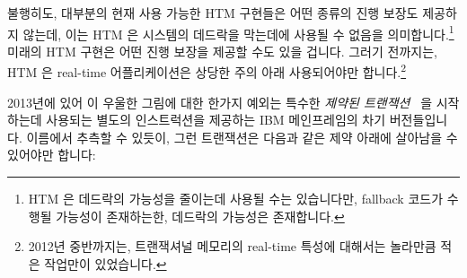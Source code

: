 불행히도, 대부분의 현재 사용 가능한 HTM 구현들은 어떤 종류의 진행 보장도
제공하지 않는데, 이는 HTM 은 시스템의 데드락을 막는데에 사용될 수 없음을
의미합니다.\footnote{
	HTM 은 데드락의 가능성을 줄이는데 사용될 수는 있습니다만, fallback
	코드가 수행될 가능성이 존재하는한, 데드락의 가능성은 존재합니다.}
미래의 HTM 구현은 어떤 진행 보장을 제공할 수도 있을 겁니다.
그러기 전까지는, HTM 은 real-time 어플리케이션은 상당한 주의 아래 사용되어야만
합니다.\footnote{
	2012년 중반까지는, 트랜잭셔널 메모리의 real-time 특성에 대해서는
	놀라만큼 적은 작업만이 있었습니다.}
\iffalse

Even though transaction size, conflicts, and aborts/rollbacks can all
cause transactions to abort, one might hope that sufficiently small and
short-duration transactions could be guaranteed to eventually succeed.
This would permit a transaction to be unconditionally retried, in the
same way that compare-and-swap (CAS) and load-linked/store-conditional
(LL/SC) operations are unconditionally retried in code that uses these
instructions to implement atomic operations.

Unfortunately, most currently available HTM implementation refuse to
make any
sort of forward-progress guarantee, which means that HTM cannot be
used to avoid deadlock on those systems.\footnote{
	HTM might well be used to reduce the probability of deadlock,
	but as long as there is some possibility of the fallback
	code being executed, there is some possibility of deadlock.}
Hopefully future implementations of HTM will provide some sort of
forward-progress guarantees.
Until that time, HTM must be used with extreme caution in real-time
applications.\footnote{
	As of mid-2012, there has been surprisingly little work on
	transactional memory's real-time characteristics.}
\fi

2013년에 있어 이 우울한 그림에 대한 한가지 예외는 특수한 \emph{제약된
트랜잭션}~\cite{ChristianJacobi2012MainframeTM} 을 시작하는데 사용되는 별도의
인스트럭션을 제공하는 IBM 메인프레임의 차기 버전들입니다.
이름에서 추측할 수 있듯이, 그런 트랜잭션은 다음과 같은 제약 아래에 살아남을 수
있어야만 합니다:
\iffalse

The one exception to this gloomy picture as of 2013 is upcoming versions
of the IBM mainframe, which provides a separate instruction that may be
used to start a special
\emph{constrained transaction}~\cite{ChristianJacobi2012MainframeTM}.
As you might guess from the name, such transactions must live within
the following constraints:
\fi


